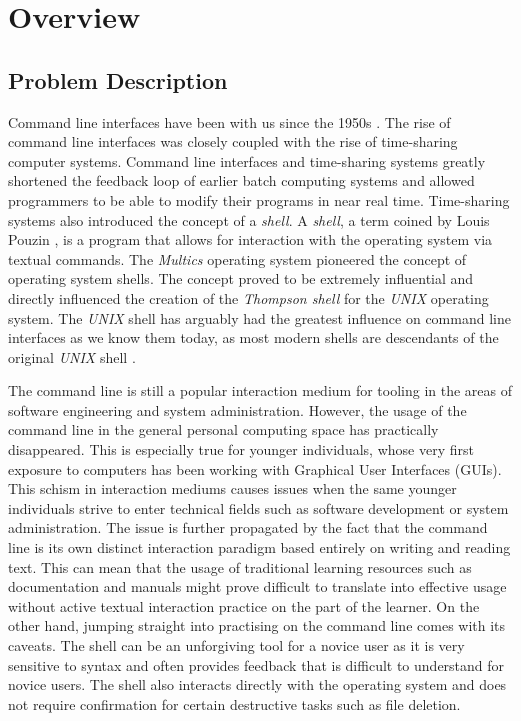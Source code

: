 \chapter{Overview}
\label{chap:overview}
\section{Problem Description}

Command line interfaces have been with us since the 1950s
\cite{raymond2004art}. The rise of command line interfaces was closely coupled
with the rise of time-sharing computer systems. Command line interfaces and
time-sharing systems greatly shortened the feedback loop of earlier batch
computing systems and allowed programmers to be able to modify their programs
in near real time. Time-sharing systems also introduced the concept of a
\textit{shell}. A \textit{shell}, a term coined by Louis Pouzin \cite{pouzin},
is a program that allows for interaction with the operating system via textual
commands. The \textit{Multics}\cite{corbato1965introduction} operating system
pioneered the concept of operating system shells. The concept proved to be
extremely influential and directly influenced the creation of the
\textit{Thompson shell} for the \textit{UNIX} operating system. The
\textit{UNIX} shell has arguably had the greatest influence on command line
interfaces as we know them today, as most modern shells are descendants of the
original \textit{UNIX} shell \cite{raymond2004art}.

The command line is still a popular interaction medium for tooling in the areas
of software engineering and system administration. However, the usage of the
command line in the general personal computing space has practically
disappeared. This is especially true for younger individuals, whose very first
exposure to computers has been working with Graphical User Interfaces (GUIs).
This schism in interaction mediums causes issues when the same younger
individuals strive to enter technical fields such as software development or
system administration. The issue is further propagated by the fact that the
command line is its own distinct interaction paradigm based entirely on writing
and reading text. This can mean that the usage of traditional learning
resources such as documentation and manuals might prove difficult to translate
into effective usage without active textual interaction practice on the part of
the learner. On the other hand, jumping straight into practising on the command
line comes with its caveats. The shell can be an unforgiving tool for a novice
user as it is very sensitive to syntax and often provides feedback that is
difficult to understand for novice users. The shell also interacts directly
with the operating system and does not require confirmation for certain
destructive tasks such as file deletion.

